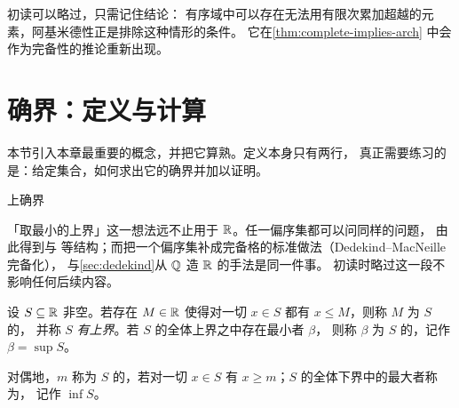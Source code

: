 \begin{remark}
   初读可以略过，只需记住结论：
  有序域中可以存在无法用有限次累加超越的元素，阿基米德性正是排除这种情形的条件。
  它在\cref{thm:complete-implies-arch} 中会作为完备性的推论重新出现。
\end{remark}

\section{确界：定义与计算}
\label{sec:sup-calc}

本节引入本章最重要的概念，并把它算熟。定义本身只有两行，
真正需要练习的是：给定集合，如何求出它的确界并加以证明。

\begin{concept}{上确界}
\end{concept}

\begin{remark}[选读]
  「取最小的上界」这一想法远不止用于 \(\mathbb{R}\)。任一偏序集都可以问同样的问题，
  由此得到与
  等结构；而把一个偏序集补成完备格的标准做法（Dedekind--MacNeille 完备化），
  与\cref{sec:dedekind}从 \(\mathbb{Q}\) 造 \(\mathbb{R}\) 的手法是同一件事。
  初读时略过这一段不影响任何后续内容。
\end{remark}

\begin{definition}[上界与上确界]
  \label{def:supremum}
  设 \(S \subseteq \mathbb{R}\) 非空。若存在 \(M \in \mathbb{R}\) 使得对一切 \(x \in S\)
  都有 \(x \le M\)，则称 \(M\) 为 \(S\) 的，
  并称 \(S\) \emph{有上界}。若 \(S\) 的全体上界之中存在最小者 \(\beta\)，
  则称 \(\beta\) 为 \(S\) 的，记作 \(\beta = \sup S\)。

  对偶地，\(m\) 称为 \(S\) 的，若对一切 \(x \in S\)
  有 \(x \ge m\)；\(S\) 的全体下界中的最大者称为，
  记作 \(\inf S\)。
\end{definition}

